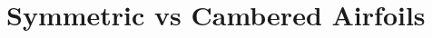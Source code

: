 \documentclass[main.tex]{subfiles}
\begin{document}
\section{Symmetric vs Cambered Airfoils}
\end{document}
